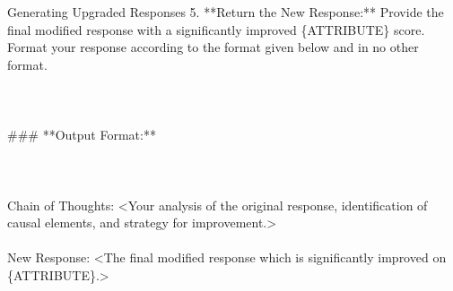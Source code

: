 \begin{promptbox}{Generating Upgraded Responses}
5. **Return the New Response:** Provide the final modified response with a significantly improved \{ATTRIBUTE\} score. Format your response according to the format given below and in no other format.\\\\
\\\\
\#\#\# **Output Format:**\\\\
\\\\
Chain of Thoughts: <Your analysis of the original response, identification of causal elements, and strategy for improvement.>\\\\
New Response: <The final modified response which is significantly improved on \{ATTRIBUTE\}.>
\end{promptbox}

